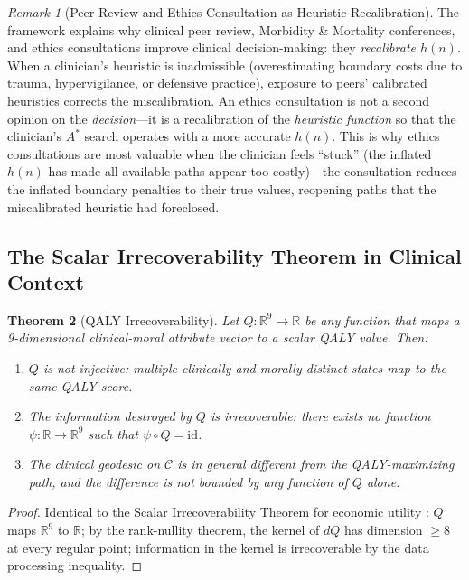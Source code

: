 \documentclass[12pt]{article}
\newtheorem{theorem}{Theorem}[section]
\theoremstyle{definition}
\theoremstyle{remark}
\newtheorem{remark}[theorem]{Remark}
\newcommand{\C}{\mathcal{C}}               %
\newcommand{\R}{\mathbb{R}}
\begin{document}
\begin{remark}[Peer Review and Ethics Consultation as Heuristic Recalibration]
The framework explains why clinical peer review, Morbidity \& Mortality conferences, and ethics consultations improve clinical decision-making: they \emph{recalibrate $h(n)$}.  When a clinician's heuristic is inadmissible (overestimating boundary costs due to trauma, hypervigilance, or defensive practice), exposure to peers' calibrated heuristics corrects the miscalibration.  An ethics consultation is not a second opinion on the \emph{decision}---it is a recalibration of the \emph{heuristic function} so that the clinician's $A^*$ search operates with a more accurate $h(n)$.  This is why ethics consultations are most valuable when the clinician feels ``stuck'' (the inflated $h(n)$ has made all available paths appear too costly)---the consultation reduces the inflated boundary penalties to their true values, reopening paths that the miscalibrated heuristic had foreclosed.
\end{remark}

\subsection{The Scalar Irrecoverability Theorem in Clinical Context}

\begin{theorem}[QALY Irrecoverability]
\label{thm:irrecoverability}
Let $Q: \R^9 \to \R$ be any function that maps a 9-dimensional clinical-moral attribute vector to a scalar QALY value.  Then:
\begin{enumerate}
    \item $Q$ is not injective: multiple clinically and morally distinct states map to the same QALY score.
    \item The information destroyed by $Q$ is irrecoverable: there exists no function $\psi: \R \to \R^9$ such that $\psi \circ Q = \mathrm{id}$.
    \item The clinical geodesic on $\C$ is in general different from the QALY-maximizing path, and the difference is not bounded by any function of $Q$ alone.
\end{enumerate}
\end{theorem}

\begin{proof}
Identical to the Scalar Irrecoverability Theorem for economic utility \cite{bond2026geometric}: $Q$ maps $\R^9$ to $\R$; by the rank-nullity theorem, the kernel of $dQ$ has dimension $\geq 8$ at every regular point; information in the kernel is irrecoverable by the data processing inequality.
\end{proof}
\end{document}
